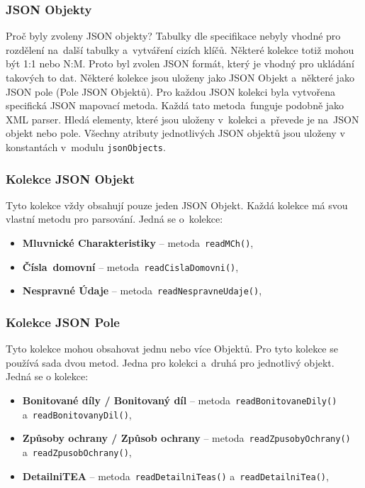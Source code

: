 \subsubsection*{JSON Objekty}
Proč byly zvoleny JSON objekty? Tabulky dle specifikace nebyly vhodné pro rozdělení na~další tabulky a~vytváření cizích klíčů.
Některé kolekce totiž mohou být 1:1 nebo N:M. Proto byl zvolen JSON formát, který je vhodný pro ukládání takových to dat.
Některé kolekce jsou uloženy jako JSON Objekt a~některé jako JSON pole (Pole JSON Objektů).
Pro každou JSON kolekci byla vytvořena specifická JSON mapovací metoda. Každá tato metoda~funguje podobně jako XML parser.
Hledá elementy, které jsou uloženy v~kolekci a~převede je na~JSON objekt nebo pole.
Všechny atributy jednotlivých JSON objektů jsou uloženy v konstantách v~modulu \texttt{jsonObjects}.

\subsubsection*{Kolekce JSON Objekt}
Tyto kolekce vždy obsahují pouze jeden JSON Objekt.
Každá kolekce má svou vlastní metodu pro parsování.
Jedná se o~kolekce:
\begin{itemize}
    \item \textbf{Mluvnické Charakteristiky} -- metoda~\texttt{readMCh()},
    \item \textbf{Čísla~domovní} -- metoda~\texttt{readCislaDomovni()},
    \item \textbf{Nespravné Údaje} -- metoda~\texttt{readNespravneUdaje()},
\end{itemize}

\subsubsection*{Kolekce JSON Pole}
Tyto kolekce mohou obsahovat jednu nebo více Objektů.
Pro tyto kolekce se používá sada dvou metod. Jedna pro kolekci a~druhá pro jednotlivý objekt. 
Jedná se o kolekce:
\begin{itemize}
    \item \textbf{Bonitované díly / Bonitovaný díl} -- metoda~\texttt{readBonitovaneDily()} \\ a~\texttt{readBonitovanyDil()},
    \item \textbf{Způsoby ochrany / Způsob ochrany} -- metoda~\texttt{readZpusobyOchrany()} \\ a~\texttt{readZpusobOchrany()},
    \item \textbf{DetailniTEA} -- metoda~\texttt{readDetailniTeas()} a~\texttt{readDetailniTea()},
\end{itemize}

